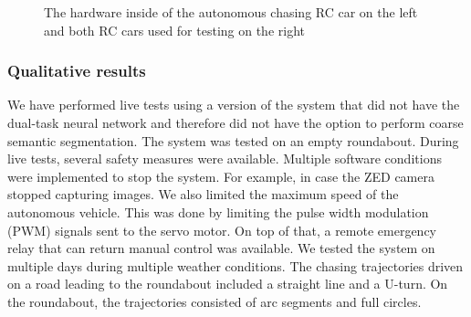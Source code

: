 \documentclass{ctuthesis/ctuthesis}
\begin{document}
\begin{figure}[]
    \centering
    \qquad
    \caption{The hardware inside of the autonomous chasing RC car on the left and both RC cars used for testing on the right}%
    \label{fig:rc_cars}%
\end{figure}



\subsubsection{Qualitative results}
We have performed live tests using a version of the system that did not have the dual-task neural network and therefore did not have the option to perform coarse semantic segmentation. The system was tested on an empty roundabout. During live tests, several safety measures were available. Multiple software conditions were implemented to stop the system. For example, in case the ZED camera stopped capturing images. We also limited the maximum speed of the autonomous vehicle. This was done by limiting the pulse width modulation (PWM) signals sent to the servo motor. On top of that, a remote emergency relay that can return manual control was available. We tested the system on multiple days during multiple weather conditions. The chasing trajectories driven on a road leading to the roundabout included a straight line and a U-turn. On the roundabout, the trajectories consisted of arc segments and full circles. \par
\end{document}

